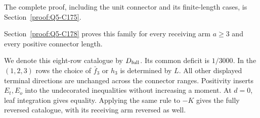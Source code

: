 \begin{description}[style=nextline,leftmargin=1.6em]
\item[{$(1,\allowbreak 3,\allowbreak c)$, $c\ge\allowbreak 4$; $F=\allowbreak qf_3h_c$; $L\ge\allowbreak 1$; $\epsilon=\allowbreak 1/800$}]
\label{row:Dfull:13c}
The complete proof, including the unit connector and its finite-length
cases, is Section~\ref{proof:Q5-C175}.

\item[{$(1,\allowbreak b,\allowbreak c)$, $4\le\allowbreak  b<\allowbreak c$; $F=\allowbreak qf_bh_c$; $L\ge\allowbreak 1$; $\epsilon=\allowbreak 1/3000$}]
\label{row:Dfull:1bc}
Section~\ref{proof:Q5-C178} proves this family for every receiving arm
$a\ge\allowbreak 3$ and every positive connector length.
\end{description}

We denote this eight-row catalogue by $D_{\rm full}$.
Its common deficit is $1/3000$. In the $(1,\allowbreak 2,\allowbreak 3)$ rows the choice of
$\bar f_3$ or $h_3$ is determined by $L$. All other displayed terminal
directions are unchanged across the connector ranges. Positivity inserts
$E_t,\allowbreak E_o$ into the undecorated inequalities without increasing a moment.
At $d=\allowbreak 0$, leaf integration gives equality. Applying the same rule to $-K$
gives the fully reversed catalogue, with its receiving arm reversed as well.
